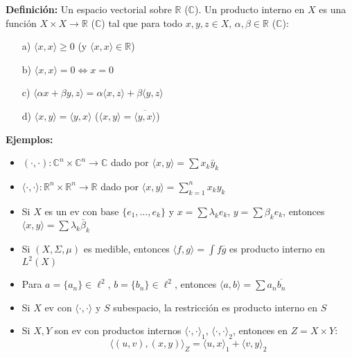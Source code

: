 \documentclass{article}
\begin{document}
\textbf{Definición:} Un espacio vectorial sobre $\mathbb{R}$ ($\mathbb{C}$). Un producto interno en $X$ es una función $X \times X \to \mathbb{R}$ ($\mathbb{C}$) tal que para todo $x, y, z \in X$, $\alpha, \beta \in \mathbb{R}$ ($\mathbb{C}$):
\begin{itemize}
    \item[a)] $\langle x, x \rangle \ge 0$ (y $\langle x, x \rangle \in \mathbb{R}$)
    \item[b)] $\langle x, x \rangle = 0 \iff x = 0$
    \item[c)] $\langle \alpha x + \beta y, z \rangle = \alpha \langle x, z \rangle + \beta \langle y, z \rangle$
    \item[d)] $\langle x, y \rangle = \langle y, x \rangle$ \quad ($\langle x, y \rangle = \overline{\langle y, x \rangle}$)
\end{itemize}

\textbf{Ejemplos:}
\begin{itemize}
    \item $(\cdot, \cdot): \mathbb{C}^n \times \mathbb{C}^n \to \mathbb{C}$ dado por $\langle x, y \rangle = \sum x_k \bar{y}_k$
    \item $\langle \cdot, \cdot \rangle: \mathbb{R}^n \times \mathbb{R}^n \to \mathbb{R}$ dado por $\langle x, y \rangle = \sum_{k=1}^n x_k y_k$
    \item Si $X$ es un ev con base $\{e_1, \dots, e_k\}$ y $x = \sum \lambda_k e_k$, $y = \sum \beta_k e_k$, entonces $\langle x, y \rangle = \sum \lambda_k \bar{\beta}_k$
    \item Si $(X, \Sigma, \mu)$ es medible, entonces $\langle f, g \rangle = \int f \overline{g}$ es producto interno en $L^2(X)$
    \item Para $a = \{a_n\} \in \ell^2$, $b = \{b_n\} \in \ell^2$, entonces $\langle a, b \rangle = \sum a_n \overline{b_n}$
    \item Si $X$ ev con $\langle \cdot, \cdot \rangle$ y $S$ subespacio, la restricción es producto interno en $S$
    \item Si $X, Y$ son ev con productos internos $\langle \cdot, \cdot \rangle_1$, $\langle \cdot, \cdot \rangle_2$, entonces en $Z = X \times Y$:
    \[
    \langle (u, v), (x, y) \rangle_Z = \langle u, x \rangle_1 + \langle v, y \rangle_2
    \]
\end{itemize}

\end{document}
